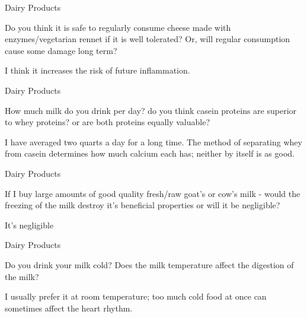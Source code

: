 \documentclass[11pt,oneside,openany,extrafontsizes]{memoir}
\begin{document}
\begin{qaexchange}{Dairy Products}

    \begin{question}
        Do you think it is safe to regularly consume cheese made with enzymes/vegetarian rennet if it is well tolerated? Or, will regular consumption cause some damage long term? 
    \end{question}

    \begin{answer}
      I think it increases the risk of future inflammation.
    \end{answer}
\end{qaexchange}

\begin{qaexchange}{Dairy Products}

    \begin{question}
        How much milk do you drink per day? do you think casein proteins are superior to whey proteins? or are both proteins equally valuable?
    \end{question}

    \begin{answer}
      I have averaged two quarts a day for a long time. The method of separating whey from casein determines how much calcium each has; neither by itself is as good.
    \end{answer}
\end{qaexchange}

\begin{qaexchange}{Dairy Products}

    \begin{question}
      If I buy large amounts of good quality fresh/raw goat's or cow's milk - would the freezing of the milk destroy it's beneficial properties or will it be negligible? 
    \end{question}

    \begin{answer}
      It's negligible
    \end{answer}
\end{qaexchange}

\begin{qaexchange}{Dairy Products}

    \begin{question}
        Do you drink your milk cold? Does the milk temperature affect the digestion of the milk?
    \end{question}

    \begin{answer}
      I usually prefer it at room temperature; too much cold food at once can sometimes affect the heart rhythm.
    \end{answer}
\end{qaexchange}
\end{document}
